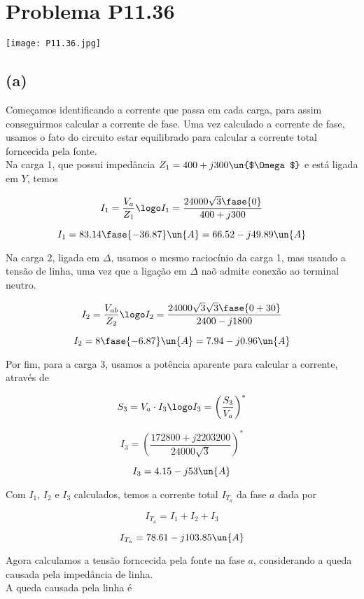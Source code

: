 
\section*{Problema P11.36}

\renewcommand*\thesection{11.36}

\begin{center}
    \texttt{[image: P11.36.jpg]}
\end{center}

\subsection*{(a)} 

Começamos identificando a corrente que passa em cada carga, para assim conseguirmos calcular a corrente de fase. Uma vez calculado a corrente
de fase, usamos o fato do circuito estar equilibrado para calcular a corrente total forncecida pela fonte. \\
Na carga 1, que possui impedância $Z_1 = 400 + j300 \un{$\Omega$}$ e está ligada em $Y$, temos

\[ I_1 = \frac{V_a}{Z_1} \logo I_1 = \frac{24000\sqrt{3}\fase{0}}{400 + j300 }  \]

\[ I_1 = 83.14\fase{-36.87} \un{A} = 66.52 - j49.89 \un{A} \]

Na carga 2, ligada em $\Delta$, usamos o mesmo raciocínio da carga 1, mas usando a tensão de linha, uma vez que a 
ligação em $\Delta$ naõ admite conexão ao terminal neutro.

\[ I_2 = \frac{V_{ab}}{Z_2} \logo I_2 = \frac{24000\sqrt{3}\sqrt{3}\fase{0 + 30}}{2400 - j1800}  \]

\[ I_2 = 8\fase{-6.87} \un{A} = 7.94 - j0.96 \un{A} \]

Por fim, para a carga 3, usamos a potência aparente para calcular a corrente, através de  

\[ S_3 = V_a \cdot I_3 \logo I_3 = \left(\frac{S_3}{V_a}\right)^* \]

\[ I_3 = \left(\frac{172800 + j2203200}{24000\sqrt{3}}\right)^* \]

\[ I_3 = 4.15 - j53 \un{A} \]

Com $I_1$, $I_2$ e $I_3$ calculados, temos a corrente total $I_{T_a}$ da fase $a$ dada por   

\[ I_{T_a} = I_1 + I_2 + I_3 \]

\[ I_{T_a} = 78.61 - j103.85 \un{A} \]

Agora calculamos a tensão forncecida pela fonte na fase $a$, considerando a queda causada pela impedância de linha. \\
A queda causada pela linha é  

